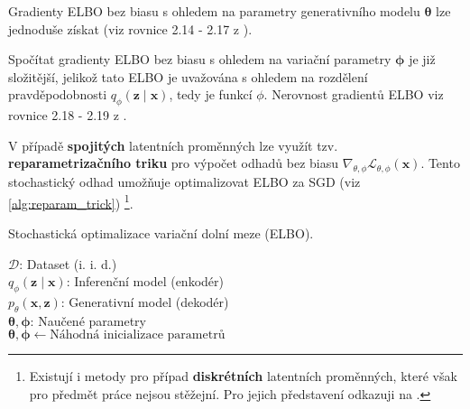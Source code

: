 Gradienty ELBO bez biasu s ohledem na parametry generativního modelu $\boldsymbol{\theta}$ lze jednoduše získat (viz rovnice 2.14 - 2.17 z \cite{Kingma2019}).

Spočítat gradienty ELBO bez biasu s ohledem na variační parametry $\boldsymbol{\phi}$ je již složitější, jelikož tato ELBO je uvažována s ohledem na rozdělení pravděpodobnosti $q_\phi(\textbf{z}\mid\textbf{x})$, tedy je funkcí $\phi$. Nerovnost gradientů ELBO viz rovnice 2.18 - 2.19 z \cite{Kingma2019}.

V případě \textbf{spojitých} latentních proměnných lze využít tzv. \textbf{reparametrizačního triku} pro výpočet odhadů bez biasu $\nabla_{\theta,\phi}\mathcal{L}_{\theta,\phi}(\textbf{x})$.
Tento stochastický odhad umožňuje optimalizovat ELBO za SGD (viz \autoref{alg:reparam_trick})
\footnote{Existují i metody pro případ \textbf{diskrétních} latentních proměnných, které však pro předmět práce nejsou stěžejní. Pro jejich představení odkazuji na \cite[Sekce 2.9.1.]{Kingma2019}.}.

\begin{algorithm}[H]
    \caption{Stochastická optimalizace variační dolní meze (ELBO).}\label{alg:reparam_trick}
        \KwData{}
                \hspace{6mm}$\mathcal{D}$: Dataset (i. i. d.)\\
                \hspace{6mm}$q_\phi(\textbf{z}\mid\textbf{x})$: Inferenční model (enkodér)\\
                \hspace{6mm}$p_\theta(\textbf{x}, \textbf{z})$: Generativní model (dekodér)\\
        \KwResult{}
        \hspace{6mm}$\boldsymbol{\theta}, \boldsymbol{\phi}$: Naučené parametry\\

        $\boldsymbol{\theta}, \boldsymbol{\phi} \gets \text{Náhodná inicializace parametrů}$

\end{algorithm}

